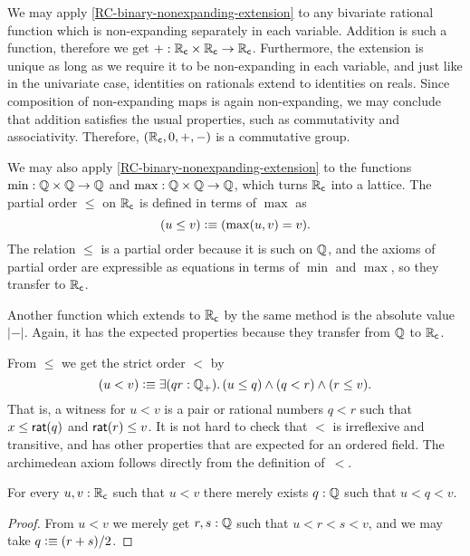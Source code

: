 We may apply \autoref{RC-binary-nonexpanding-extension} to any bivariate rational function
which is non-expanding separately in each variable. Addition is such a function, therefore
we get ${+} : \mathbb{R}_\mathsf{c} \times \mathbb{R}_\mathsf{c} \to \mathbb{R}_\mathsf{c}$. Furthermore, the extension is unique as long as we
require it to be non-expanding in each variable, and just like in the univariate case,
identities on rationals extend to identities on reals. Since composition of non-expanding
maps is again non-expanding, we may conclude that addition satisfies the usual properties,
such as commutativity and associativity. Therefore, $(\mathbb{R}_\mathsf{c}, 0, {+}, {-})$ is a commutative
group.

We may also apply \autoref{RC-binary-nonexpanding-extension} to the functions $\min : \mathbb{Q} \times
\mathbb{Q} \to \mathbb{Q}$ and $\max : \mathbb{Q} \times \mathbb{Q} \to \mathbb{Q}$, which turns $\mathbb{R}_\mathsf{c}$ into a lattice. The partial
order $\leq$ on $\mathbb{R}_\mathsf{c}$ is defined in terms of $\max$ as
%
\begin{equation*}
  (u \leq v) \vcentcolon\equiv (\max(u, v) = v).
\end{equation*}
%
The relation $\leq$ is a partial order because it is such on $\mathbb{Q}$, and the axioms of
partial order are expressible as equations in terms of $\min$ and $\max$, so they transfer
to $\mathbb{R}_\mathsf{c}$.

Another function which extends to $\mathbb{R}_\mathsf{c}$ by the same method is the absolute value $|{-}|$.
Again, it has the expected properties because they transfer from $\mathbb{Q}$ to $\mathbb{R}_\mathsf{c}$.

From $\leq$ we get the strict order $<$ by
%
\begin{equation*}
  (u < v) \defeq \exis{q r : \Qp} (u \leq q) \land (q < r) \land (r \leq v).
\end{equation*}
%
That is, a witness for $u < v$ is a pair or rational numbers $q < r$ such that $x \leq
\mathsf{rat}(q)$ and $\mathsf{rat}(r) \leq v$. It is not hard to check that $<$ is irreflexive and
transitive, and has other properties that are expected for an ordered field.
The archimedean axiom follows directly from the definition of~$<$.

\begin{thm} \label{RC-archimedean}
  For every $u, v : \mathbb{R}_\mathsf{c}$ such that $u < v$ there merely exists $q : \mathbb{Q}$ such that $u < q < v$.
\end{thm}

\begin{proof}
  From $u < v$ we merely get $r, s : \mathbb{Q}$ such that $u < r < s < v$, and we may take $q
  \vcentcolon\equiv (r + s) / 2$.
\end{proof}

